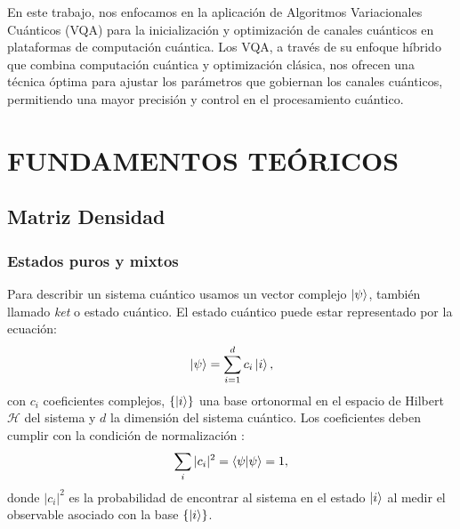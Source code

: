 \documentclass[letterpaper,12pt]{thesisECFM}
\theoremstyle{plain}
\theoremstyle{definition}
\theoremstyle{definition}
\theoremstyle{remark}
\newcommand{\1}{\mathbb{1}}
\begin{document}
En este trabajo, nos enfocamos en la aplicación de Algoritmos Variacionales Cuánticos (VQA) para la inicialización y optimización de canales cuánticos en plataformas de computación cuántica. Los VQA, a través de su enfoque híbrido que combina computación cuántica y optimización clásica, nos ofrecen una técnica óptima para ajustar los parámetros que gobiernan los canales cuánticos, permitiendo una mayor precisión y control en el procesamiento cuántico.

 
\chapter{FUNDAMENTOS TEÓRICOS} \label{cap:fundamentos:teoricos}%
\section{Matriz Densidad} %
\subsection{Estados puros y mixtos} %
Para describir un sistema cuántico usamos un vector complejo $\ket{\psi}$,
también llamado \textit{ket} o estado cuántico. El
estado cuántico puede estar representado por la ecuación: 
\begin{equation}
     \label{eq:1.1}
         \ket{\psi} = \sum_{i=1}^{d} c_i \ket{i},
\end{equation}
con $c_i$ coeficientes complejos,
$\{\ket{i}\}$ una base ortonormal en el espacio de Hilbert $\mathcal{H}$ del
sistema  y $d$ la dimensión del
sistema cuántico.  Los coeficientes deben cumplir con la condición de
normalización \cite{nielsen_chuang_2011}:
    \begin{equation}
    \label{ec::1.2}
           \sum_i |c_i|^2=\braket{\psi}{\psi}=1, 
    \end{equation} 
donde $|c_i|^2$ es la probabilidad de encontrar al sistema en el estado
$\ket{i}$ al medir el observable asociado con la base $\{\ket{i} \}$.
\end{document}
